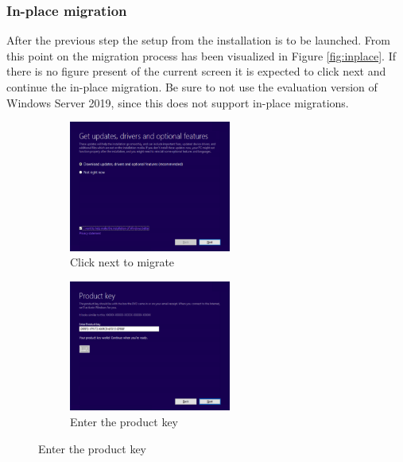\subsubsection{In-place migration}
After the previous step the setup from the installation is to be launched. From this point on the migration process has been visualized in Figure \ref{fig:inplace}. If there is no figure present of the current screen it is expected to click next and continue the in-place migration. Be sure to not use the evaluation version of Windows Server 2019, since this does not support in-place migrations.
\begin{figure}[h]
	\begin{subfigure}{0.5\textwidth}
		\includegraphics[width=0.9\linewidth,height=4.3cm]{img/In-Place_WS_2.png}
		\captionsetup{width=0.8\linewidth}
		\centering		
		\caption{Click next to migrate}
		\label{fig:inplace2}
	\end{subfigure}
	\begin{subfigure}{0.5\textwidth}
		\captionsetup{width=0.8\linewidth}
		\includegraphics[width=0.9\linewidth,height=4.3cm]{img/In-Place_WS_3.png}
		\centering
		\caption{Enter the product key}
		\label{fig:inplace3}
	\end{subfigure}
\end{figure}

